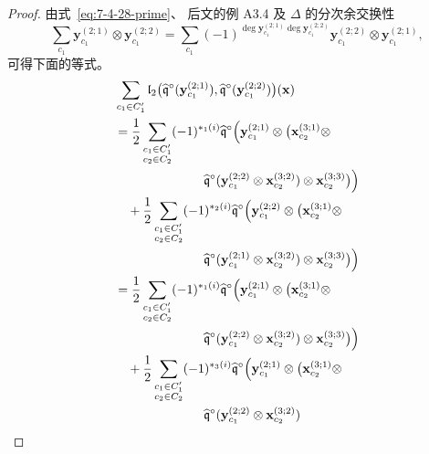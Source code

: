 \begin{proof}
由式~\eqref{eq:7-4-28-prime}、
后文的例 A3.4
及 $\Delta$ 的分次余交换性
\begin{equation}
\sum_{c_1}
\mathbf y_{c_1}^{(2;1)}
\otimes\mathbf y_{c_1}^{(2;2)}
=\sum_{c_1}
(-1)^{
\deg\mathbf y_{c_1}^{(2;1)}
\deg\mathbf y_{c_1}^{(2;2)}}
\mathbf y_{c_1}^{(2;2)}
\otimes\mathbf y_{c_1}^{(2;1)},
\tag{7.4.37}\label{eq:7-4-37}
\end{equation}
可得下面的等式。
\begin{equation}
\begin{aligned}
&\sum_{c_1\in C'_1}
\mathfrak l_2\bigl(
\widehat{\mathfrak q}^{\circ}
(\mathbf y_{c_1}^{(2;1)}),
\widehat{\mathfrak q}^{\circ}
(\mathbf y_{c_1}^{(2;2)})\bigr)
(\mathbf x)\\
&=\frac12
\sum_{\substack{c_1\in C'_1\\c_2\in C_2}}
(-1)^{\ast_1(i)}
\widehat{\mathfrak q}^{\circ}
\Bigl(\mathbf y_{c_1}^{(2;1)}
\otimes\bigl(
\mathbf x_{c_2}^{(3;1)}\otimes\\
&\hspace{7em}
\widehat{\mathfrak q}^{\circ}
(\mathbf y_{c_1}^{(2;2)}
\otimes\mathbf x_{c_2}^{(3;2)})
\otimes\mathbf x_{c_2}^{(3;3)}
\bigr)\Bigr)\\
&\quad+\frac12
\sum_{\substack{c_1\in C'_1\\c_2\in C_2}}
(-1)^{\ast_2(i)}
\widehat{\mathfrak q}^{\circ}
\Bigl(\mathbf y_{c_1}^{(2;2)}
\otimes\bigl(
\mathbf x_{c_2}^{(3;1)}\otimes\\
&\hspace{7em}
\widehat{\mathfrak q}^{\circ}
(\mathbf y_{c_1}^{(2;1)}
\otimes\mathbf x_{c_2}^{(3;2)})
\otimes\mathbf x_{c_2}^{(3;3)}
\bigr)\Bigr)\\
&=\frac12
\sum_{\substack{c_1\in C'_1\\c_2\in C_2}}
(-1)^{\ast_1(i)}
\widehat{\mathfrak q}^{\circ}
\Bigl(\mathbf y_{c_1}^{(2;1)}
\otimes\bigl(
\mathbf x_{c_2}^{(3;1)}\otimes\\
&\hspace{7em}
\widehat{\mathfrak q}^{\circ}
(\mathbf y_{c_1}^{(2;2)}
\otimes\mathbf x_{c_2}^{(3;2)})
\otimes\mathbf x_{c_2}^{(3;3)}
\bigr)\Bigr)\\
&\quad+\frac12
\sum_{\substack{c_1\in C'_1\\c_2\in C_2}}
(-1)^{\ast_3(i)}
\widehat{\mathfrak q}^{\circ}
\Bigl(\mathbf y_{c_1}^{(2;1)}
\otimes\bigl(
\mathbf x_{c_2}^{(3;1)}\otimes\\
&\hspace{7em}
\widehat{\mathfrak q}^{\circ}
(\mathbf y_{c_1}^{(2;2)}
\otimes\mathbf x_{c_2}^{(3;2)})

\end{aligned}
\end{equation}
\end{proof}

